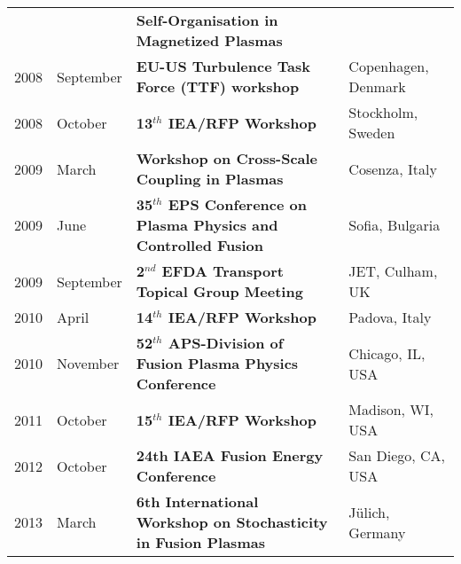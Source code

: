{\begin{longtable}{llll}
& & \textbf{Self-Organisation in Magnetized Plasmas} & \\
2008 & September & \textbf{EU-US Turbulence Task Force (TTF) workshop}
& Copenhagen, Denmark \\
2008 & October & \textbf{13$^{th}$ IEA/RFP Workshop} & Stockholm,
Sweden \\
2009 & March & \textbf{Workshop on Cross-Scale Coupling in Plasmas} &
Cosenza, Italy  \\
2009 & June & \textbf{35$^{th}$ EPS Conference on Plasma Physics and
  Controlled Fusion} & Sofia, Bulgaria \\
2009 & September & \textbf{2$^{nd}$ EFDA Transport Topical Group
  Meeting} & JET, Culham, UK \\
2010 & April & \textbf{14$^{th}$ IEA/RFP Workshop} & Padova, Italy \\
2010 & November & \textbf{52$^{th}$ APS-Division of Fusion Plasma
  Physics Conference} & Chicago, IL, USA \\
2011 & October & \textbf{15$^{th}$ IEA/RFP Workshop} & Madison, WI,
USA \\
2012 & October & \textbf{24th IAEA Fusion Energy Conference} & San
Diego, CA, USA\\
2013 & March & \textbf{6th International Workshop on Stochasticity in
  Fusion Plasmas} & J{\"u}lich, Germany
\end{longtable}
}
